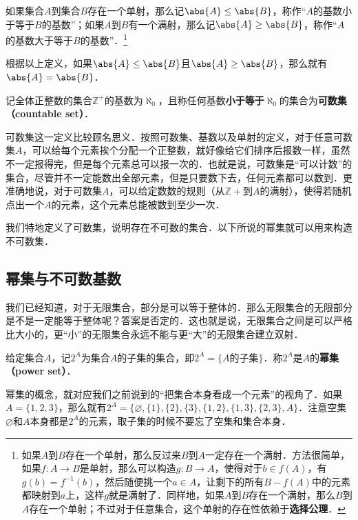 \begin{definition}{}
如果集合$A$到集合$B$存在一个单射，那么记$\abs{A}\leq\abs{B}$，称作“$A$的基数小于等于$B$的基数”；如果$A$到$B$有一个满射，那么记$\abs{A}\geq\abs{B}$，称作“$A$的基数大于等于$B$的基数”．\footnote{如果$A$到$B$存在一个单射，那么反过来$B$到$A$一定存在一个满射．方法很简单，如果$f:A\rightarrow B$是单射，那么可以构造$g:B\rightarrow A$，使得对于$b\in f(A)$，有$g(b)=f^{-1}(b)$，然后随便挑一个$a\in A$，让剩下的所有$B-f(A)$中的元素都映射到$a$上，这样$g$就是满射了．同样地，如果$A$到$B$存在一个满射，那么$B$到$A$存在一个单射；不过对于任意集合，这个单射的存在性依赖于\textbf{选择公理}．}
\end{definition}

根据以上定义，如果$\abs{A}\leq\abs{B}$且$\abs{A}\geq\abs{B}$，那么就有$\abs{A}=\abs{B}$．

\begin{definition}{}
记全体正整数的集合$\mathbb{Z}^+$的基数为$\aleph_0$，且称任何基数\textbf{小于等于}$\aleph_0$的集合为\textbf{可数集（countable set）}．
\end{definition}

可数集这一定义比较顾名思义．按照可数集、基数以及单射的定义，对于任意可数集$A$，可以给每个元素挨个分配一个正整数，就好像给它们排序后报数一样，虽然不一定报得完，但是每个元素总可以报一次的．也就是说，可数集是“可以计数”的集合，尽管并不一定能数出全部元素，但是只要数下去，任何元素都可以数到．更准确地说，对于可数集$A$，可以给定数数的规则（从$\mathbb{Z}+$到$A$的满射），使得若随机点出一个$A$的元素，这个元素总能被数到至少一次．

我们特地定义了可数集，说明存在不可数的集合．以下所说的幂集就可以用来构造不可数集．





\subsection{幂集与不可数基数}

我们已经知道，对于无限集合，部分是可以等于整体的．那么无限集合的无限部分是不是一定能等于整体呢？答案是否定的．这也就是说，无限集合之间是可以严格比大小的，更“小”的无限集合永远不能与更“大”的无限集合建立双射．

\begin{definition}{}
给定集合$A$，记$2^A$为集合$A$的子集的集合，即$2^A=\{A\text{的子集}\}$．称$2^A$是$A$的\textbf{幂集（power set）}．
\end{definition}

幂集的概念，就对应我们之前说到的“把集合本身看成一个元素”的视角了．如果$A=\{1,2,3\}$，那么就有$2^A=\{\varnothing, \{1\}, \{2\}, \{3\}, \{1,2\}, \{1,3\}, \{2,3\}, A\}$．注意空集$\varnothing$和$A$本身都是$2^A$的元素，取子集的时候不要忘了空集和集合本身．

